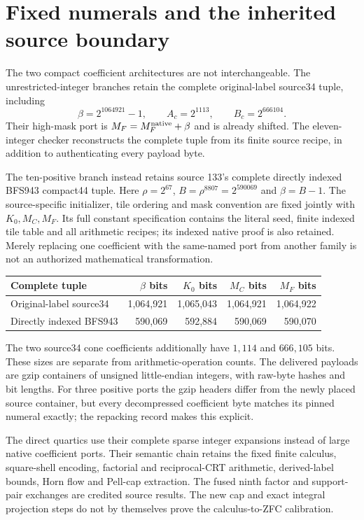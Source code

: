 \section{Fixed numerals and the inherited source boundary}
The two compact coefficient architectures are not interchangeable.
The unrestricted-integer branches retain the complete original-label source34
tuple, including
\[
 \beta=2^{1064921}-1,\qquad A_c=2^{1113},\qquad B_c=2^{666104}.
\]
Their high-mask port is $M_F=M_F^{\rm native}+\beta$ and is already shifted.
The eleven-integer checker reconstructs the complete tuple from its finite
source recipe, in addition to authenticating every payload byte.

The ten-positive branch instead retains source 133's complete directly indexed
BFS943 compact44 tuple. Here $\rho=2^{67}$,
$B=\rho^{8807}=2^{590069}$ and $\beta=B-1$.
The source-specific initializer, tile ordering and mask convention are fixed
jointly with $K_0,M_C,M_F$. Its full constant specification contains the literal
seed, finite indexed tile table and all arithmetic recipes; its indexed native
proof is also retained. Merely replacing one coefficient with the same-named
port from another family is not an authorized mathematical transformation.

\begin{center}\small
\begin{tabular}{lrrrr}
\toprule
Complete tuple & $\beta$ bits & $K_0$ bits & $M_C$ bits & $M_F$ bits\\
\midrule
Original-label source34 &1,064,921&1,065,043&1,064,921&1,064,922\\
Directly indexed BFS943 &590,069&592,884&590,069&590,070\\
\bottomrule
\end{tabular}
\end{center}
The two source34 cone coefficients additionally have $1,114$ and $666,105$
bits. These sizes are separate from arithmetic-operation counts. The delivered
payloads are gzip containers of unsigned little-endian integers, with raw-byte
hashes and bit lengths. For three positive ports the gzip headers differ from
the newly placed source container, but every decompressed coefficient byte
matches its pinned numeral exactly; the repacking record makes this explicit.

The direct quartics use their complete sparse integer expansions instead of
large native coefficient ports. Their semantic chain retains the fixed finite
calculus, square-shell encoding, factorial and reciprocal-CRT arithmetic,
derived-label bounds, Horn flow and Pell-cap extraction. The fused ninth
factor and support-pair exchanges are credited source results. The new cap
and exact integral projection steps do not by themselves prove the
calculus-to-ZFC calibration.


